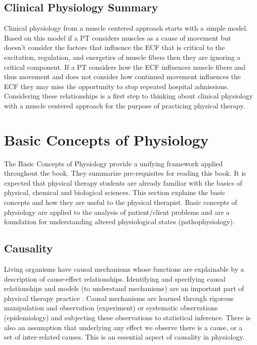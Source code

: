 \subsection{Clinical Physiology Summary}

Clinical physiology from a muscle centered approach starts with a simple model. Based on this model if a PT considers muscles as a cause of movement but doesn't consider the factors that influence the ECF that is critical to the excitation, regulation, and energetics\footnotemark{} of muscle fibers then they are ignoring a critical component. If a PT considers how the ECF influences muscle fibers and thus movement and does not consider how continued movement influences the ECF they may miss the opportunity to stop repeated hospital admissions.\footnotemark{} Considering these relationships is a first step to thinking about clinical physiology with a muscle centered approach for the purpose of practicing physical therapy.

\section{Basic Concepts of  Physiology}

The Basic Concepts of Physiology provide a unifying framework applied throughout the book. They summarize pre-requisites for reading this book. It is expected that physical therapy students are already familiar with the basics of physical, chemical and biological sciences. This section explains the basic concepts and how they are useful to the physical therapist. Basic concepts of physiology are applied to the analysis of patient/client problems and are a foundation for understanding altered physiological states (pathophysiology).

\subsection{Causality}
Living organisms have causal mechanisms whose functions are explainable by a description of cause-effect relationships. Identifying and specifying causal relationships and models (to understand mechanisms) are an important part of physical therapy practice \cite{collins_synthesis_2018}. Causal mechanisms are learned through rigorous manipulation and observation (experiment) or systematic observations (epidemiology) and subjecting these observations to statistical inference. There is also an assumption that underlying any effect we observe there is a cause, or a set of inter-related causes. This is an essential aspect of causality in physiology.
